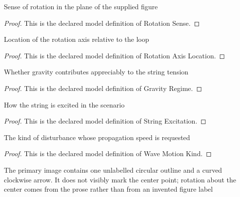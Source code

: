 \begin{definition}
  \label{def:physics:phyx-mini-0306:phyxminiproblems-problemphyxmini0306-rotationsense}
  Sense of rotation in the plane of the supplied figure
\end{definition}
\begin{proof}
  This is the declared model definition of Rotation Sense.
\end{proof}
\begin{definition}
  \label{def:physics:phyx-mini-0306:phyxminiproblems-problemphyxmini0306-rotationaxislocation}
  Location of the rotation axis relative to the loop
\end{definition}
\begin{proof}
  This is the declared model definition of Rotation Axis Location.
\end{proof}
\begin{definition}
  \label{def:physics:phyx-mini-0306:phyxminiproblems-problemphyxmini0306-gravityregime}
  Whether gravity contributes appreciably to the string tension
\end{definition}
\begin{proof}
  This is the declared model definition of Gravity Regime.
\end{proof}
\begin{definition}
  \label{def:physics:phyx-mini-0306:phyxminiproblems-problemphyxmini0306-stringexcitation}
  How the string is excited in the scenario
\end{definition}
\begin{proof}
  This is the declared model definition of String Excitation.
\end{proof}
\begin{definition}
  \label{def:physics:phyx-mini-0306:phyxminiproblems-problemphyxmini0306-wavemotionkind}
  The kind of disturbance whose propagation speed is requested
\end{definition}
\begin{proof}
  This is the declared model definition of Wave Motion Kind.
\end{proof}
\begin{definition}
  \label{def:physics:phyx-mini-0306:phyxminiproblems-problemphyxmini0306-circularloopfigure}
  The primary image contains one unlabelled circular outline and a curved clockwise arrow. It does not visibly mark the center point; rotation about the center comes from the prose rather than from an invented figure label
\end{definition}
